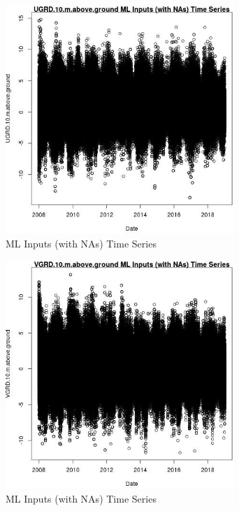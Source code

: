 \begin{figure} 
\centering  
\includegraphics[width=0.77\textwidth]{Code_Outputs/Report_ML_input_PM25_Step4_part_f_de_duplicated_aveswNAs_UGRD10mabovegroundvDate.jpg} 
\caption{\label{fig:Report_ML_input_PM25_Step4_part_f_de_duplicated_aveswNAsUGRD10mabovegroundvDate}ML Inputs (with NAs) Time Series} 
\end{figure} 
 

\begin{figure} 
\centering  
\includegraphics[width=0.77\textwidth]{Code_Outputs/Report_ML_input_PM25_Step4_part_f_de_duplicated_aveswNAs_VGRD10mabovegroundvDate.jpg} 
\caption{\label{fig:Report_ML_input_PM25_Step4_part_f_de_duplicated_aveswNAsVGRD10mabovegroundvDate}ML Inputs (with NAs) Time Series} 
\end{figure} 
 

